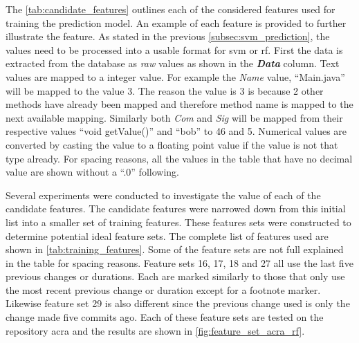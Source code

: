 
The \autoref{tab:candidate_features} outlines each of the considered features used for training the prediction model. An example of each feature is provided to further illustrate the feature. As stated in the previous \autoref{subsec:svm_prediction}, the values need to be processed into a usable format for \gls{svm} or \gls{rf}. First the data is extracted from the database as \textit{raw} values as shown in the \textit{\textbf{Data}} column. Text values are mapped to a integer value. For example the \textit{Name} value, ``Main.java'' will be mapped to the value 3. The reason the value is 3 is because 2 other methods have already been mapped and therefore method name is mapped to the next available mapping. Similarly both \textit{Com} and \textit{Sig} will be mapped from their respective values ``void getValue()'' and ``bob'' to 46 and 5. Numerical values are converted by casting the value to a floating point value if the value is not that type already. For spacing reasons, all the values in the table that have no decimal value are shown without a ``.0'' following.

Several experiments were conducted to investigate the value of each of the candidate features. The candidate features were narrowed down from this initial list into a smaller set of training features. These features sets were constructed to determine potential ideal feature sets. The complete list of features used are shown in \autoref{tab:training_features}. Some of the feature sets are not full explained in the table for spacing reasons. Feature sets 16, 17, 18 and 27 all use the last five previous changes or durations. Each are marked similarly to those that only use the most recent previous change or duration except for a footnote marker. Likewise feature set 29 is also different since the previous change used is only the change made five commits ago. Each of these feature sets are tested on the repository acra and the results are shown in \autoref{fig:feature_set_acra_rf}. 

